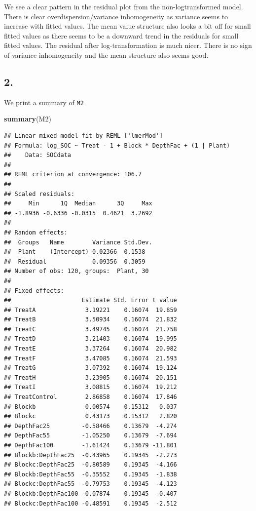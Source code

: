 \documentclass[
]{article}
\newenvironment{Shaded}{\begin{snugshade}}{\end{snugshade}}
\newcommand{\FunctionTok}[1]{\textcolor[rgb]{0.13,0.29,0.53}{\textbf{#1}}}
\newcommand{\NormalTok}[1]{#1}
\begin{document}
We see a clear pattern in the residual plot from the non-logtransformed
model. There is clear overdispersion/variance inhomogeneity as variance
seems to increase with fitted values. The mean value structure also
looks a bit off for small fitted values as there seems to be a downward
trend in the residuals for small fitted values. The residual after
log-transformation is much nicer. There is no sign of variance
inhomogeneity and the mean structure also seems good.

\hypertarget{section-5}{%
\subsection{2.}\label{section-5}}

We print a summary of \texttt{M2}

\begin{Shaded}
\begin{Highlighting}[]
\FunctionTok{summary}\NormalTok{(M2)}
\end{Highlighting}
\end{Shaded}

\begin{verbatim}
## Linear mixed model fit by REML ['lmerMod']
## Formula: log_SOC ~ Treat - 1 + Block * DepthFac + (1 | Plant)
##    Data: SOCdata
## 
## REML criterion at convergence: 106.7
## 
## Scaled residuals: 
##     Min      1Q  Median      3Q     Max 
## -1.8936 -0.6336 -0.0315  0.4621  3.2692 
## 
## Random effects:
##  Groups   Name        Variance Std.Dev.
##  Plant    (Intercept) 0.02366  0.1538  
##  Residual             0.09356  0.3059  
## Number of obs: 120, groups:  Plant, 30
## 
## Fixed effects:
##                    Estimate Std. Error t value
## TreatA              3.19221    0.16074  19.859
## TreatB              3.50934    0.16074  21.832
## TreatC              3.49745    0.16074  21.758
## TreatD              3.21403    0.16074  19.995
## TreatE              3.37264    0.16074  20.982
## TreatF              3.47085    0.16074  21.593
## TreatG              3.07392    0.16074  19.124
## TreatH              3.23905    0.16074  20.151
## TreatI              3.08815    0.16074  19.212
## TreatControl        2.86858    0.16074  17.846
## Blockb              0.00574    0.15312   0.037
## Blockc              0.43173    0.15312   2.820
## DepthFac25         -0.58466    0.13679  -4.274
## DepthFac55         -1.05250    0.13679  -7.694
## DepthFac100        -1.61424    0.13679 -11.801
## Blockb:DepthFac25  -0.43965    0.19345  -2.273
## Blockc:DepthFac25  -0.80589    0.19345  -4.166
## Blockb:DepthFac55  -0.35552    0.19345  -1.838
## Blockc:DepthFac55  -0.79753    0.19345  -4.123
## Blockb:DepthFac100 -0.07874    0.19345  -0.407
## Blockc:DepthFac100 -0.48591    0.19345  -2.512
\end{verbatim}
\end{document}
